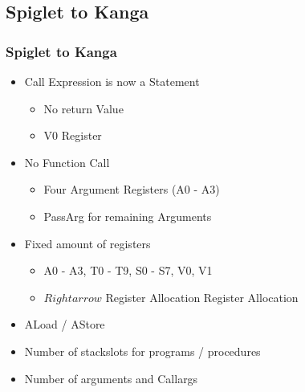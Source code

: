 \begin{frame}
  \section*{Spiglet to Kanga}
  \frametitle{Spiglet to Kanga}
  \begin{itemize}
    \item Call Expression is now a Statement
    \begin{itemize}
        \item No return Value
    \end{itemize}
    \begin{itemize}
        \item V0 Register
    \end{itemize}
    \item No Function Call
    \begin{itemize}
        \item Four Argument Registers (A0 - A3)
        \item PassArg for remaining Arguments
    \end{itemize}
    \item Fixed amount of registers
    \begin{itemize}
        \item A0 - A3, T0 - T9, S0 - S7, V0, V1
        \item $Rightarrow$ Register Allocation Register Allocation
    \end{itemize}
    \item ALoad / AStore
    \item Number of stackslots for programs / procedures
    \item Number of arguments and Callargs
  \end{itemize}
\end{frame}

